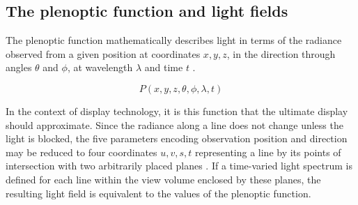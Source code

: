 \subsection{The plenoptic function and light fields}

The plenoptic function mathematically describes light in terms of the radiance observed from a given position at coordinates $x, y, z$, in the direction through angles $\theta$ and $\phi$, at wavelength $\lambda$ and time $t$ \cite{bergen1991plenoptic}.

$$
P(x, y, z, \theta, \phi, \lambda, t)
$$


In the context of display technology, it is this function that the ultimate display should approximate. Since the radiance along a line does not change unless the light is blocked, the five parameters encoding observation position and direction may be reduced to four coordinates $u, v, s, t$ representing a line by its points of intersection with two arbitrarily placed planes \cite{levoy2023light}. If a time-varied light spectrum is defined for each line within the view volume enclosed by these planes, the resulting light field is equivalent to the values of the plenoptic function.